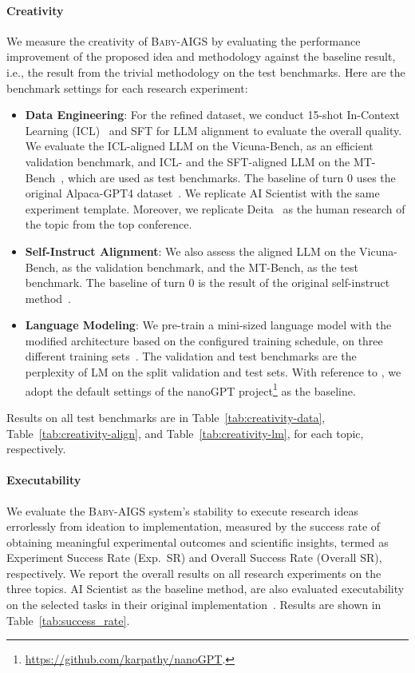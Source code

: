 \documentclass{article} %
\newcommand{\AIGSSys}{\textsc{Baby-AIGS}\xspace}
\begin{document}
\paragraph{Creativity} We measure the creativity of \AIGSSys by evaluating the performance improvement of the proposed idea and methodology against the baseline result, i.e., the result from the trivial methodology on the test benchmarks. Here are the benchmark settings for each research experiment:
\begin{itemize}
    \item \textbf{Data Engineering}: For the refined dataset, we conduct 15-shot In-Context Learning (ICL)~\citep{jiang2024manyshot} and SFT for LLM alignment to evaluate the overall quality. We evaluate the ICL-aligned LLM on the Vicuna-Bench, as an efficient validation benchmark, and ICL- and the SFT-aligned LLM on the MT-Bench~\citep{zheng2023judging}, which are used as test benchmarks. The baseline of turn 0 uses the original Alpaca-GPT4 dataset~\citep{peng2023instruction}. We replicate AI Scientist with the same experiment template. Moreover, we replicate Deita~\citep{deita} as the human research of the topic from the top conference.  
    \item \textbf{Self-Instruct Alignment}: We also assess the aligned LLM on the Vicuna-Bench, as the validation benchmark, and the MT-Bench, as the test benchmark. The baseline of turn 0 is the result of the original self-instruct method~\citep{wang-etal-2023-self-instruct}. 
    \item \textbf{Language Modeling}: We pre-train a mini-sized language model with the modified architecture based on the configured training schedule, on three different training sets~\citep{karpathy2015shakespeare, hutter2006enwik8, mahoney2011text8}. The validation and test benchmarks are the perplexity of LM on the split validation and test sets. With reference to \citet{lu2024aiscientist}, we adopt the default settings of the nanoGPT project\footnote{\url{https://github.com/karpathy/nanoGPT}.} as the baseline. 
\end{itemize}
Results on all test benchmarks are in Table~\ref{tab:creativity-data}, Table~\ref{tab:creativity-align}, and Table~\ref{tab:creativity-lm}, for each topic, respectively. 

\paragraph{Executability} We evaluate the \AIGSSys system's stability to execute research ideas errorlessly from ideation to implementation, measured by the success rate of obtaining meaningful experimental outcomes and scientific insights, termed as Experiment Success Rate (Exp.~SR) and Overall Success Rate (Overall SR), respectively. We report the overall results on all research experiments on the three topics. AI Scientist as the baseline method, are also evaluated executability on the selected tasks in their original implementation~\citep{lu2024aiscientist}. Results are shown in Table~\ref{tab:success_rate}.  
\end{document}
